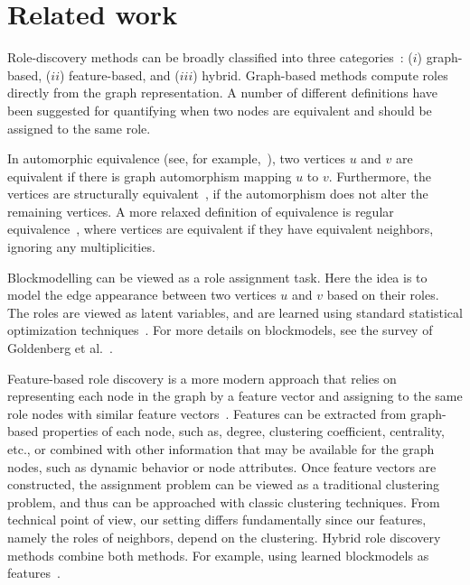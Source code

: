 \section{Related work}
\label{section:related}


Role-discovery methods can be broadly classified into three categories~\cite{rossi2015role}: 
($i$) graph-based, 
($ii$) feature-based, and 
($iii$) hybrid.
Graph-based methods compute roles directly from the graph representation. 
A number of different definitions have been suggested
for quantifying when two nodes are equivalent and should be assigned to the same role. 

In automorphic equivalence (see, for example,~\cite{hanneman:05:introduction}),
two vertices $u$ and $v$ are equivalent if there is graph automorphism
mapping $u$ to $v$.  Furthermore, the vertices are structurally
equivalent~\cite{lorrain1971structural}, if the automorphism does not alter the
remaining vertices. A more relaxed definition of equivalence is regular
equivalence~\cite{everett1994regular}, where vertices are equivalent if they
have equivalent neighbors, ignoring any multiplicities. 

Blockmodelling can be viewed as a role assignment task. Here the idea is to
model the edge appearance between two vertices $u$ and $v$ based on their roles.
The roles are viewed as latent variables, and are learned using standard
statistical optimization techniques~\cite{snijders:97:estimation}.
For more details on blockmodels, see the survey of Goldenberg et al.~\cite{Goldenberg:2010:SSN}.

\iffalse
stochastic equivalence~\cite{holland1981exponential}.
Typically, methods for graph-based role discovery rely on 
blockmodels~\cite{airoldi2009mixed,holland1983stochastic}, 
which are based on matrix-decomposition techniques
and are not easily scalable to very large graphs. 
\fi

Feature-based role discovery is a more modern approach that relies on
representing each node in the graph by a feature vector and assigning to the
same role nodes with similar feature
vectors~\cite{henderson2012rolx,rossi2015role,rossi2013modeling,zhao2013inferring,gilpin2013guided}.
Features can be extracted from graph-based properties of each node, such as,
degree, clustering coefficient, centrality, etc., or combined with other
information that may be available for the graph nodes, such as dynamic behavior
or node attributes. 
Once feature vectors are constructed, the assignment
problem can be viewed as a traditional clustering problem, and thus can be
approached with classic clustering techniques. From technical point of view,
our setting differs fundamentally since our features, namely the roles of
neighbors, depend on the clustering.
Hybrid role discovery methods combine both methods. For example, using learned blockmodels
as features~\cite{rossi2015role}.


